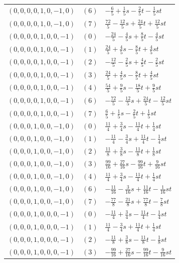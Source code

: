 \begin{longtable}{@{}lll@{}}
$(0,0,0,0,1,0,-1,0)$ & $(6)$ & $-\frac{6}{5}+\frac{1}{5}s-\frac{2}{5}t-\frac{1}{5}st$\\
$(0,0,0,0,1,0,-1,0)$ & $(7)$ & $\frac{72}{5}-\frac{12}{5}s+\frac{24}{5}t+\frac{12}{5}st$\\
$(0,0,0,0,1,0,0,-1)$ & $(0)$ & $-\frac{24}{5}-\frac{4}{5}s+\frac{8}{5}t-\frac{4}{5}st$\\
$(0,0,0,0,1,0,0,-1)$ & $(1)$ & $\frac{24}{5}+\frac{4}{5}s-\frac{8}{5}t+\frac{4}{5}st$\\
$(0,0,0,0,1,0,0,-1)$ & $(2)$ & $-\frac{12}{5}-\frac{2}{5}s+\frac{4}{5}t-\frac{2}{5}st$\\
$(0,0,0,0,1,0,0,-1)$ & $(3)$ & $\frac{24}{5}+\frac{4}{5}s-\frac{8}{5}t+\frac{4}{5}st$\\
$(0,0,0,0,1,0,0,-1)$ & $(4)$ & $\frac{54}{5}+\frac{9}{5}s-\frac{18}{5}t+\frac{9}{5}st$\\
$(0,0,0,0,1,0,0,-1)$ & $(6)$ & $-\frac{72}{5}-\frac{12}{5}s+\frac{24}{5}t-\frac{12}{5}st$\\
$(0,0,0,0,1,0,0,-1)$ & $(7)$ & $\frac{6}{5}+\frac{1}{5}s-\frac{2}{5}t+\frac{1}{5}st$\\
$(0,0,0,1,0,0,-1,0)$ & $(0)$ & $\frac{11}{4}+\frac{3}{4}s-\frac{11}{4}t+\frac{1}{4}st$\\
$(0,0,0,1,0,0,-1,0)$ & $(1)$ & $-\frac{11}{4}-\frac{3}{4}s+\frac{11}{4}t-\frac{1}{4}st$\\
$(0,0,0,1,0,0,-1,0)$ & $(2)$ & $\frac{11}{8}+\frac{3}{8}s-\frac{11}{8}t+\frac{1}{8}st$\\
$(0,0,0,1,0,0,-1,0)$ & $(3)$ & $\frac{99}{16}+\frac{27}{16}s-\frac{99}{16}t+\frac{9}{16}st$\\
$(0,0,0,1,0,0,-1,0)$ & $(4)$ & $\frac{11}{4}+\frac{3}{4}s-\frac{11}{4}t+\frac{1}{4}st$\\
$(0,0,0,1,0,0,-1,0)$ & $(6)$ & $-\frac{11}{16}-\frac{3}{16}s+\frac{11}{16}t-\frac{1}{16}st$\\
$(0,0,0,1,0,0,-1,0)$ & $(7)$ & $-\frac{77}{8}-\frac{21}{8}s+\frac{77}{8}t-\frac{7}{8}st$\\
$(0,0,0,1,0,0,0,-1)$ & $(0)$ & $-\frac{11}{4}+\frac{3}{4}s-\frac{11}{4}t-\frac{1}{4}st$\\
$(0,0,0,1,0,0,0,-1)$ & $(1)$ & $\frac{11}{4}-\frac{3}{4}s+\frac{11}{4}t+\frac{1}{4}st$\\
$(0,0,0,1,0,0,0,-1)$ & $(2)$ & $-\frac{11}{8}+\frac{3}{8}s-\frac{11}{8}t-\frac{1}{8}st$\\
$(0,0,0,1,0,0,0,-1)$ & $(3)$ & $-\frac{99}{16}+\frac{27}{16}s-\frac{99}{16}t-\frac{9}{16}st$\\

\end{longtable}
